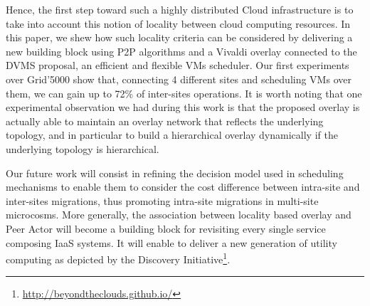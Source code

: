 Hence, the first step toward such a highly distributed Cloud infrastructure is to take
into account this notion of locality between cloud computing resources. In this paper, we
shew how such locality criteria can be considered by delivering a new building block using
P2P algorithms and a Vivaldi overlay connected to the DVMS proposal, an efficient and
flexible VMs scheduler. Our first experiments over Grid'5000 show that, connecting 4
different sites and scheduling VMs over them, we can gain up to 72\% of inter-sites
operations. It is worth noting that one experimental observation we had during this work
is that the proposed overlay is actually able to maintain an overlay network that
reflects the underlying topology, and in particular to build a hierarchical overlay
dynamically if the underlying topology is hierarchical.

Our future work will consist in refining the decision model used in scheduling mechanisms
to enable them to consider the cost difference between intra-site and inter-sites
migrations, thus promoting intra-site migrations in multi-site microcosms. More generally,
the association between locality based overlay and Peer Actor will become a building block
for revisiting every single service composing IaaS systems. It will enable to deliver a
new generation of utility computing as depicted by the Discovery
Initiative\footnote{\url{http://beyondtheclouds.github.io/}}.
